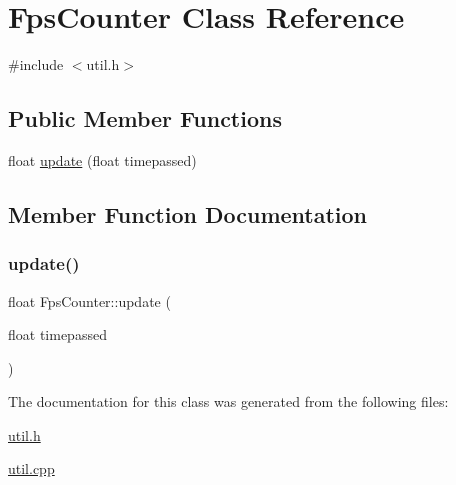 \hypertarget{classFpsCounter}{}\section{Fps\+Counter Class Reference}
\label{classFpsCounter}


{\ttfamily \#include $<$util.\+h$>$}

\subsection*{Public Member Functions}
\begin{DoxyCompactItemize}
\item 
float \hyperlink{classFpsCounter_ae9957d6f9e8d1d0710ca73eca43f7e5b}{update} (float timepassed)
\end{DoxyCompactItemize}


\subsection{Member Function Documentation}
\mbox{\label{classFpsCounter_ae9957d6f9e8d1d0710ca73eca43f7e5b}} 
\subsubsection{\texorpdfstring{update()}{update()}}
{\footnotesize\ttfamily float Fps\+Counter\+::update (\begin{DoxyParamCaption}\item[{float}]{timepassed }\end{DoxyParamCaption})}



The documentation for this class was generated from the following files\+:\begin{DoxyCompactItemize}
\item 
\hyperlink{util_8h}{util.\+h}\item 
\hyperlink{util_8cpp}{util.\+cpp}\end{DoxyCompactItemize}
